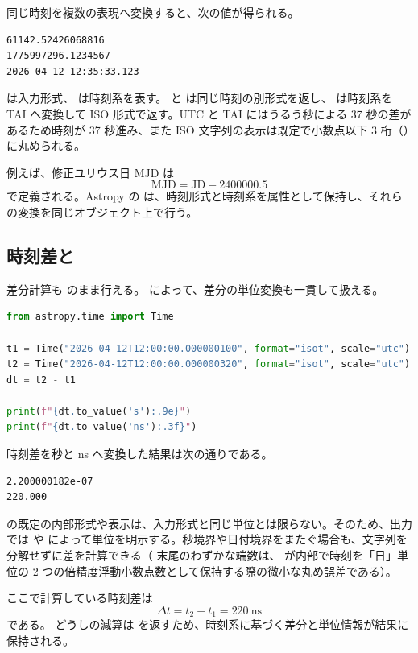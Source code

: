 同じ時刻を複数の表現へ変換すると、次の値が得られる。

\begin{lstlisting}[numbers=none, xleftmargin=2\zw]
61142.52426068816
1775997296.1234567
2026-04-12 12:35:33.123
\end{lstlisting}

 は入力形式、 は時刻系を表す。 と  は同じ時刻の別形式を返し、 は時刻系を TAI へ変換して ISO 形式で返す。UTC と TAI にはうるう秒による 37 秒の差があるため時刻が 37 秒進み、また ISO 文字列の表示は既定で小数点以下 3 桁（）に丸められる。

例えば、修正ユリウス日 MJD は
\[
\mathrm{MJD} = \mathrm{JD} - 2400000.5
\]
で定義される。Astropy の  は、時刻形式と時刻系を属性として保持し、それらの変換を同じオブジェクト上で行う。

\subsection{時刻差と }

差分計算も  のまま行える。 によって、差分の単位変換も一貫して扱える。

\begin{lstlisting}[language=Python]
from astropy.time import Time

t1 = Time("2026-04-12T12:00:00.000000100", format="isot", scale="utc")
t2 = Time("2026-04-12T12:00:00.000000320", format="isot", scale="utc")
dt = t2 - t1

print(f"{dt.to_value('s'):.9e}")
print(f"{dt.to_value('ns'):.3f}")
\end{lstlisting}

時刻差を秒と ns へ変換した結果は次の通りである。

\begin{lstlisting}[numbers=none, xleftmargin=2\zw]
2.200000182e-07
220.000
\end{lstlisting}

 の既定の内部形式や表示は、入力形式と同じ単位とは限らない。そのため、出力では  や  によって単位を明示する。秒境界や日付境界をまたぐ場合も、文字列を分解せずに差を計算できる（ 末尾のわずかな端数は、 が内部で時刻を「日」単位の 2 つの倍精度浮動小数点数として保持する際の微小な丸め誤差である）。

ここで計算している時刻差は
\[
\Delta t = t_2 - t_1 = 220\ \mathrm{ns}
\]
である。 どうしの減算は  を返すため、時刻系に基づく差分と単位情報が結果に保持される。

